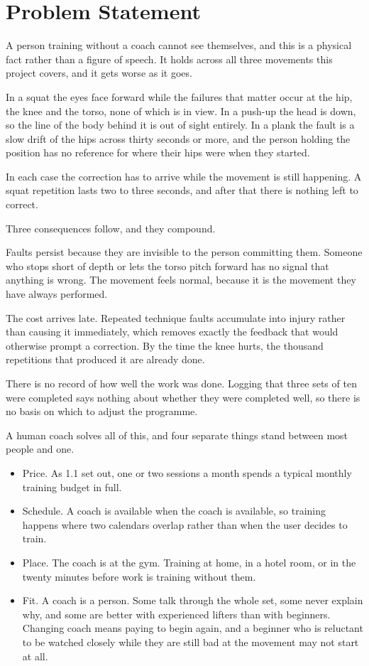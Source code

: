 \section{Problem Statement}
\label{sec:1.2}

A person training without a coach cannot see themselves, and this is a physical fact rather than a figure of speech. It holds across all three movements this project covers, and it gets worse as it goes.

In a squat the eyes face forward while the failures that matter occur at the hip, the knee and the torso, none of which is in view. In a push-up the head is down, so the line of the body behind it is out of sight entirely. In a plank the fault is a slow drift of the hips across thirty seconds or more, and the person holding the position has no reference for where their hips were when they started.

In each case the correction has to arrive while the movement is still happening. A squat repetition lasts two to three seconds, and after that there is nothing left to correct.

Three consequences follow, and they compound.

Faults persist because they are invisible to the person committing them. Someone who stops short of depth or lets the torso pitch forward has no signal that anything is wrong. The movement feels normal, because it is the movement they have always performed.

The cost arrives late. Repeated technique faults accumulate into injury rather than causing it immediately, which removes exactly the feedback that would otherwise prompt a correction. By the time the knee hurts, the thousand repetitions that produced it are already done.

There is no record of how well the work was done. Logging that three sets of ten were completed says nothing about whether they were completed well, so there is no basis on which to adjust the programme.

A human coach solves all of this, and four separate things stand between most people and one.

\begin{itemize}
\item Price. As 1.1 set out, one or two sessions a month spends a typical monthly training budget in full.
\item Schedule. A coach is available when the coach is available, so training happens where two calendars overlap rather than when the user decides to train.
\item Place. The coach is at the gym. Training at home, in a hotel room, or in the twenty minutes before work is training without them.
\item Fit. A coach is a person. Some talk through the whole set, some never explain why, and some are better with experienced lifters than with beginners. Changing coach means paying to begin again, and a beginner who is reluctant to be watched closely while they are still bad at the movement may not start at all.
\end{itemize}

